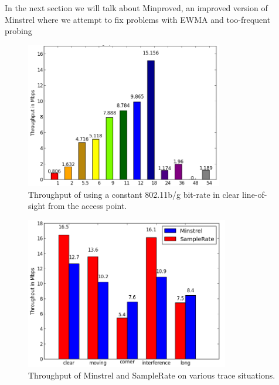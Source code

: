 \documentclass[letterpaper,twocolumn,10pt]{article}
\begin{document}
In the next section we will talk about Minproved, an improved version of Minstrel where we attempt to fix problems with EWMA and too-frequent probing

\begin{figure}[htb]
  \hspace{-1em}\includegraphics[width=3.4in]{constant.png}\vspace{-0em}
  \caption{Throughput of using a constant 802.11b/g bit-rate in clear line-of-sight from the access point.}
\label{figure:2}
\end{figure}


\begin{figure}[htb]
  \hspace{-.75em}\includegraphics[width=3.5in]{MinVSSam1.png}\vspace{-0.75em}
  \caption{Throughput of Minstrel and SampleRate on various trace situations.}
\label{figure:3}
\end{figure}
\end{document}
